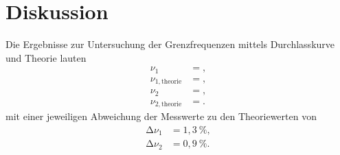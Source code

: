 \section{Diskussion}
\label{sec:Diskussion}

Die Ergebnisse zur Untersuchung der Grenzfrequenzen mittels Durchlasskurve und Theorie lauten
\begin{align*}
  \nu_{1} &= , \\
  \nu_{1, \text{theorie}} &= , \\
  \nu_{2} &= , \\
  \nu_{2, \text{theorie}} &= .
\end{align*}
mit einer jeweiligen Abweichung der Messwerte zu den Theoriewerten von
\begin{align*}
  \increment\nu_{1} &= 1,3\:\%, \\
  \increment\nu_{2} &= 0,9\:\%.
\end{align*}


